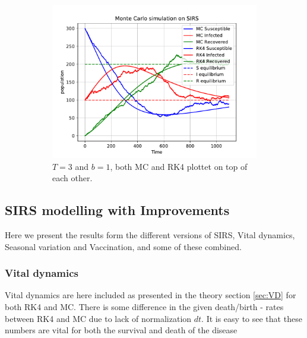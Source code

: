 \begin{figure}[H]
\begin{subfigure}{0.6\textwidth}
         \includegraphics[width=\linewidth]{../fig/newfig/MCRK4_b1T3.pdf}
         \caption{$T = 3$ and $b =1$, both MC and RK4 plottet on top of each other.}
    \end{subfigure}
    \caption{}
    \label{fig:MCSIRS}
\end{figure}

\subsection{SIRS modelling with Improvements}
Here we present the results form the different versions of SIRS, Vital dynamics, Seasonal variation and Vaccination, and some of these combined. 

\subsubsection{Vital dynamics}
Vital dynamics are here included as presented in the theory section \ref{sec:VD} for both RK4 and MC. There is some difference in the given death/birth - rates between RK4 and MC due to lack of normalization $dt$. It is easy to see that these numbers are vital for both the survival and death of the disease

